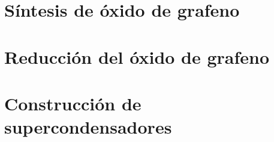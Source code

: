 \chapter{Síntesis de óxido de grafeno}

\chapter{Reducción del óxido de grafeno}

\chapter{Construcción de supercondensadores}
